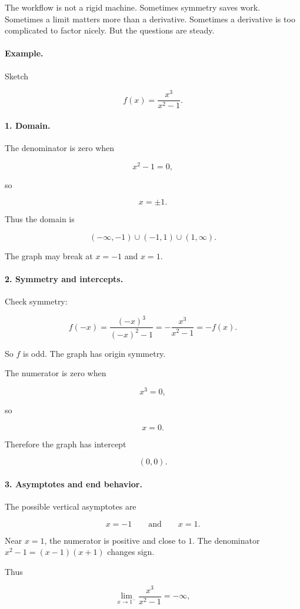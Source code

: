 The workflow is not a rigid machine.  Sometimes symmetry saves work.  Sometimes a
limit matters more than a derivative.  Sometimes a derivative is too complicated to
factor nicely.  But the questions are steady.

\paragraph{Example.}
Sketch

\[
f(x)=\frac{x^3}{x^2-1}.
\]

\paragraph{1. Domain.}
The denominator is zero when

\[
x^2-1=0,
\]

so

\[
x=\pm1.
\]

Thus the domain is

\[
(-\infty,-1)\cup(-1,1)\cup(1,\infty).
\]

The graph may break at \(x=-1\) and \(x=1\).

\paragraph{2. Symmetry and intercepts.}
Check symmetry:

\[
f(-x)=\frac{(-x)^3}{(-x)^2-1}
=
-\frac{x^3}{x^2-1}
=
-f(x).
\]

So \(f\) is odd.  The graph has origin symmetry.

The numerator is zero when

\[
x^3=0,
\]

so

\[
x=0.
\]

Therefore the graph has intercept

\[
(0,0).
\]

\paragraph{3. Asymptotes and end behavior.}
The possible vertical asymptotes are

\[
x=-1
\qquad\text{and}\qquad
x=1.
\]

Near \(x=1\), the numerator is positive and close to \(1\).  The denominator
\(x^2-1=(x-1)(x+1)\) changes sign.

Thus

\[
\lim_{x\to1^-}\frac{x^3}{x^2-1}=-\infty,
\]

